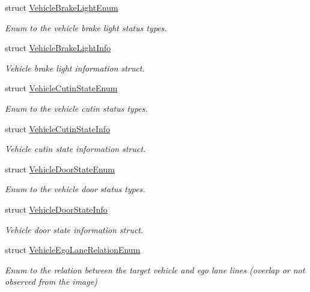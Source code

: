 \begin{DoxyCompactItemize}
struct \hyperlink{structmaf__perception__interface_1_1VehicleBrakeLightEnum}{Vehicle\+Brake\+Light\+Enum}
\begin{DoxyCompactList}\small\item\em Enum to the vehicle brake light status types. \end{DoxyCompactList}\item 
struct \hyperlink{structmaf__perception__interface_1_1VehicleBrakeLightInfo}{Vehicle\+Brake\+Light\+Info}
\begin{DoxyCompactList}\small\item\em Vehicle brake light information struct. \end{DoxyCompactList}\item 
struct \hyperlink{structmaf__perception__interface_1_1VehicleCutinStateEnum}{Vehicle\+Cutin\+State\+Enum}
\begin{DoxyCompactList}\small\item\em Enum to the vehicle cutin status types. \end{DoxyCompactList}\item 
struct \hyperlink{structmaf__perception__interface_1_1VehicleCutinStateInfo}{Vehicle\+Cutin\+State\+Info}
\begin{DoxyCompactList}\small\item\em Vehicle cutin state information struct. \end{DoxyCompactList}\item 
struct \hyperlink{structmaf__perception__interface_1_1VehicleDoorStateEnum}{Vehicle\+Door\+State\+Enum}
\begin{DoxyCompactList}\small\item\em Enum to the vehicle door status types. \end{DoxyCompactList}\item 
struct \hyperlink{structmaf__perception__interface_1_1VehicleDoorStateInfo}{Vehicle\+Door\+State\+Info}
\begin{DoxyCompactList}\small\item\em Vehicle door state information struct. \end{DoxyCompactList}\item 
struct \hyperlink{structmaf__perception__interface_1_1VehicleEgoLaneRelationEnum}{Vehicle\+Ego\+Lane\+Relation\+Enum}
\begin{DoxyCompactList}\small\item\em Enum to the relation between the target vehicle and ego lane lines (overlap or not observed from the image) \end{DoxyCompactList}\item 

\end{DoxyCompactItemize}
